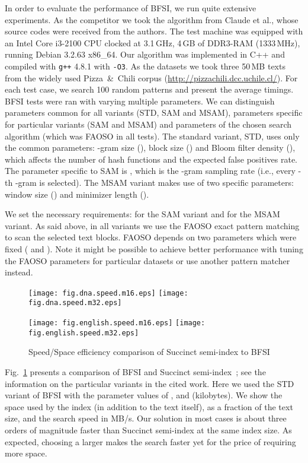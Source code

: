 \documentclass{llncs}
\begin{document}
In order to evaluate the performance of BFSI, we run quite extensive 
experiments.
As the competitor we took the algorithm from Claude et al., whose 
source codes were received from the authors.
The test machine 
was equipped with an Intel Core i3-2100 CPU clocked at 3.1\,GHz,
4\,GB of DDR3-RAM (1333\,MHz), 
running Debian 3.2.63 x86\_64. 
Our algorithm 
was implemented in C++ 
and compiled with \texttt{g++} 4.8.1 with \texttt{-O3}. 
As the datasets we took 
three 
50\,MB texts from the 
widely used Pizza~\&~Chili corpus (\url{http://pizzachili.dcc.uchile.cl/}).
For each test case, 
we search 100 random patterns 
and present the average 
timings.
BFSI tests were ran with varying multiple parameters.
We can distinguish 
parameters common for all variants (STD, SAM and MSAM), 
parameters specific for particular variants (SAM and MSAM) 
and parameters of the chosen search algorithm 
(which was FAOSO in all tests). 
The standard variant, STD, uses only the common parameters:
-gram size (), block size () and Bloom filter density 
(), which affects the number of hash functions and the expected 
false positives rate. 
The parameter specific to SAM is , 
which is the 
-gram sampling rate 
(i.e., every -th -gram is selected).
The MSAM variant makes use of two specific parameters: 
window size () and minimizer length (). 

We set the necessary requirements:
 for the SAM variant 
and
 for the MSAM variant.
As said above, in all variants we use the FAOSO exact pattern matching 
to scan the selected text blocks.
FAOSO depends on two parameters which were fixed 
( and ). 
Note it might be possible to achieve better performance with tuning the FAOSO 
parameters for particular datasets or use another pattern matcher instead.


\begin{figure}[pt]
\centerline{
\texttt{[image: fig.dna.speed.m16.eps]}
\texttt{[image: fig.dna.speed.m32.eps]}
}
\centerline{
\texttt{[image: fig.english.speed.m16.eps]}
\texttt{[image: fig.english.speed.m32.eps]}
}
\caption[Results]
{Speed/Space efficiency comparison of Succinct semi-index to BFSI}
\label{fig:speed_space_perf}
\end{figure}

Fig.~\ref{fig:speed_space_perf} presents a comparison of BFSI 
and Succinct semi-index~\cite[Sect.~2.2 and Sect.~3.1]{CNPSTjda10}; 
see the information on the particular variants in the cited work. 
Here we used the STD variant of BFSI with the parameter values of 
,  and  (kilobytes). 
We show the space used by the index (in addition to the text itself), 
as a fraction of the text size, and the search speed in MB/s.
Our solution 
in most cases is about three orders of magnitude faster 
than Succinct semi-index at
the same index size. 
As expected, choosing a larger  makes the search faster yet for the 
price of requiring more space.
\end{document}
